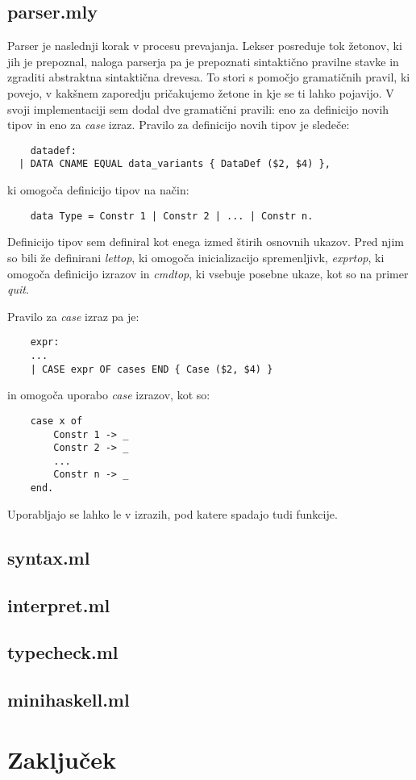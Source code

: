 \documentclass[a4paper]{report}
\begin{document}
\subsection{parser.mly}
Parser je naslednji korak v procesu prevajanja. Lekser posreduje tok žetonov, ki jih je prepoznal, naloga parserja pa je prepoznati sintaktično
pravilne stavke in zgraditi abstraktna sintaktična drevesa. To stori s pomočjo gramatičnih pravil, ki povejo, v kakšnem zaporedju pričakujemo 
žetone in kje se ti lahko pojavijo. V svoji implementaciji sem dodal dve gramatični pravili: eno za definicijo novih tipov in eno za \emph{case}
izraz. Pravilo za definicijo novih tipov je sledeče:
\begin{lstlisting}
    datadef:
  | DATA CNAME EQUAL data_variants { DataDef ($2, $4) },
\end{lstlisting}
ki omogoča definicijo tipov na način:
\begin{lstlisting}
    data Type = Constr 1 | Constr 2 | ... | Constr n.
\end{lstlisting}
Definicijo tipov sem definiral kot enega izmed štirih osnovnih ukazov. Pred njim so bili že definirani \emph{lettop}, ki omogoča inicializacijo 
spremenljivk, \emph{exprtop}, ki omogoča definicijo izrazov in \emph{cmdtop}, ki vsebuje posebne ukaze, kot so na primer \emph{quit}.

Pravilo za \emph{case} izraz pa je: 
\begin{lstlisting}
    expr:
    ...
    | CASE expr OF cases END { Case ($2, $4) }
\end{lstlisting}
in omogoča uporabo \emph{case} izrazov, kot so:
\begin{lstlisting}
    case x of 
        Constr 1 -> _
        Constr 2 -> _
        ...
        Constr n -> _
    end.
\end{lstlisting}
Uporabljajo se lahko le v izrazih, pod katere spadajo tudi funkcije.

\subsection{syntax.ml}


\subsection{interpret.ml}

\subsection{typecheck.ml}

\subsection{minihaskell.ml}

\newpage
\section{Zaključek}
\end{document}
